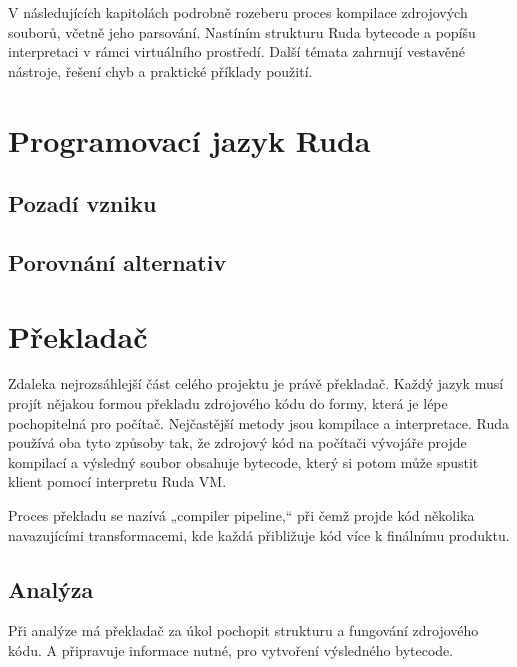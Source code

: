 \documentclass[12pt, a4paper,
twoside,        %
openright
]{report}
\let\oldchapter\chapter
\renewcommand{\chapter}{
	\clearpage
	\pagestyle{fancy}
	\oldchapter
}
\begin{document}
\noindent 
V následujících kapitolách podrobně rozeberu proces kompilace zdrojových souborů, včetně jeho parsování. Nastíním strukturu Ruda bytecode a popíšu interpretaci v rámci virtuálního prostředí. Další témata zahrnují vestavěné nástroje, řešení chyb a praktické příklady použití.



\chapter{Programovací jazyk Ruda}

\section{Pozadí vzniku}

\section{Porovnání alternativ}

\chapter{Překladač}

Zdaleka nejrozsáhlejší část celého projektu je právě překladač. Každý jazyk musí projít nějakou formou překladu zdrojového kódu do formy, která je lépe pochopitelná pro počítač. Nejčastější metody jsou kompilace a interpretace. Ruda používá oba tyto způsoby tak, že zdrojový kód na počítači vývojáře projde kompilací a výsledný soubor obsahuje bytecode, který si potom může spustit klient pomocí interpretu Ruda VM.

Proces překladu se nazívá „compiler pipeline,“ při čemž projde kód několika navazujícími transformacemi, kde každá přibližuje kód více k finálnímu produktu.

\section{Analýza}

Při analýze má překladač za úkol pochopit strukturu a fungování zdrojového kódu. A připravuje informace nutné, pro vytvoření výsledného bytecode.
\end{document}
